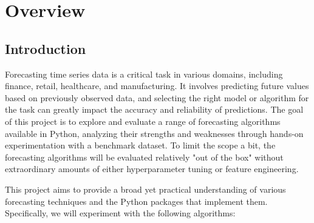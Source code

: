 \chapter{Overview}

\section{Introduction}
Forecasting time series data is a critical task in various domains, including finance, retail, healthcare, and manufacturing. It involves predicting future values based on previously observed data, and selecting the right model or algorithm for the task can greatly impact the accuracy and reliability of predictions. The goal of this project is to explore and evaluate a range of forecasting algorithms available in Python, analyzing their strengths and weaknesses through hands-on experimentation with a benchmark dataset. To limit the scope a bit, the forecasting algorithms will be evaluated relatively "out of the box" without extraordinary amounts of either hyperparameter tuning or feature engineering.\newline

This project aims to provide a broad yet practical understanding of various forecasting techniques and the Python packages that implement them. Specifically, we will experiment with the following algorithms:


